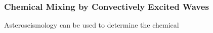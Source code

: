 {\color{purple}
\subsubsection{Chemical Mixing by Convectively Excited Waves}
}

Asteroseismology can be used to determine the chemical 

